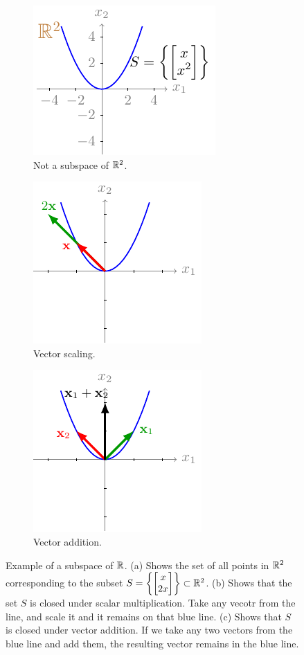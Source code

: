 \begin{figure}[h]
    \centering
    \begin{subfigure}[b]{0.32\textwidth}
        \includegraphics{figure/chapter01/nosubspace2(a).pdf}
        \caption{Not a subspace of $\mathbb{R}^2$.}
        \label{fig:ch01-nosubspace2}
    \end{subfigure}
    \begin{subfigure}[b]{0.32\textwidth}
        \centering
        \includegraphics{figure/chapter01/nosubspace2(b).pdf}
        \caption{Vector scaling.}
        \label{fig:ch01-nosubspace2-scale}
    \end{subfigure}
    \begin{subfigure}[b]{0.32\textwidth}
        \centering
        \includegraphics{figure/chapter01/nosubspace2(c).pdf}
        \caption{Vector addition.}
        \label{fig:ch01-nosubspace2-addition}
    \end{subfigure}
    \caption{Example of a subspace of $\mathbb{R}$. (a) Shows the set of all points in $\mathbb{R}^2$ corresponding to the subset $S = \left\{ \bmxc x \\ 2 x\emx\right\} \subset \mb{R}^2$. (b) Shows that the set $S$ is closed under scalar multiplication. Take any vecotr from the line, and scale it and it remains on that blue line. (c) Shows that $S$ is closed under vector addition. If we take any two vectors from the blue line and add them, the resulting vector remains in the blue line.}
\end{figure}

